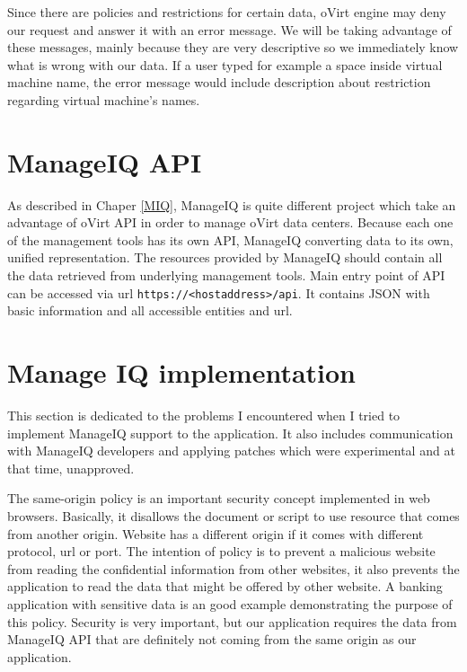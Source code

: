 Since there are policies and restrictions for certain data, oVirt engine may deny our request and answer it with an error message. We will be taking advantage of these messages, mainly because they are very descriptive so we immediately know what is wrong with our data. If a user typed for example a space inside virtual machine name, the error message would include description about restriction regarding virtual machine's names. 

\section{ManageIQ API}\label{miq}
As described in Chaper \ref{MIQ}, ManageIQ is quite different project which take an advantage of oVirt API in order to manage oVirt data centers. Because each one of the management tools has its own API, ManageIQ converting data to its own, unified representation. The resources provided by ManageIQ should contain all the data retrieved from underlying management tools.
Main entry point of API can be accessed via url \texttt{https://<hostaddress>/api}. It contains JSON with basic information and all accessible entities and url. 

\section{Manage IQ implementation}
This section is dedicated to the problems I encountered when I tried to implement ManageIQ support to the application. It also includes communication with ManageIQ developers and applying patches which were experimental and at that time, unapproved.

The same-origin policy\cite{policy} is an important security concept implemented in web browsers. Basically, it disallows the document or script to use resource that comes from another origin. Website has a different origin if it comes with different protocol, url or port. The intention of policy is to prevent a malicious website from reading the confidential information from other websites, it also prevents the application to read the data that might be offered by other website. A banking application with sensitive data is an good example demonstrating the purpose of this policy. Security is very important, but our application requires the data from ManageIQ API that are definitely not coming from the same origin as our application.

